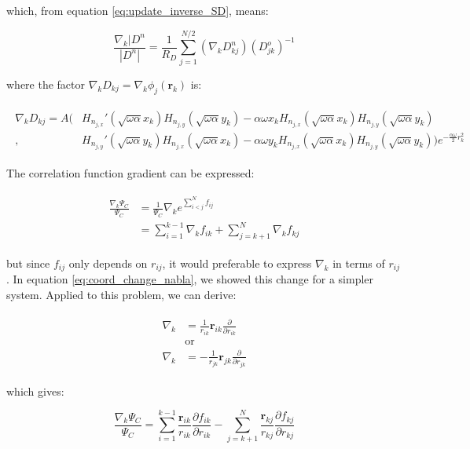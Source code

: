 \documentclass[english, a4paper]{article}
\newcommand{\bm}[1]{\mathbf{#1}}
\begin{document}
	which, from equation \ref{eq:update_inverse_SD}, means:
	
	\begin{equation}
	\frac{\nabla_k|D^n}{|D^n|} = \frac{1}{R_D}\sum_{j=1}^{N/2}(\nabla_kD_{kj}^n)(D_{jk}^o)^{-1}
	\end{equation}
	
	where the factor $\nabla_kD_{kj} = \nabla_k \phi_j(\bm{r}_k)$ is:
	
	\begin{align}
		\begin{split}
		\nabla_kD_{kj} = A\Big(&H_{n_{j,x}}'(\sqrt{\omega\alpha}x_k)H_{n_{j,y}}(\sqrt{\omega\alpha}y_k) - \alpha\omega x_kH_{n_{j,x}}(\sqrt{\omega\alpha}x_k)H_{n_{j,y}}(\sqrt{\omega\alpha}y_k)\\
		,&H_{n_{j,y}}'(\sqrt{\omega\alpha}y_k)H_{n_{j,x}}(\sqrt{\omega\alpha}x_k) - \alpha\omega y_kH_{n_{j,x}}(\sqrt{\omega\alpha}x_k)H_{n_{j,y}}(\sqrt{\omega\alpha}y_k)\Big)e^{-\frac{\alpha\omega}{2}r_k^2}
		\end{split}
	\end{align}

	The correlation function gradient can be expressed:
	
	\begin{align}
	\begin{split}
	\frac{\nabla_k \Psi_C}{\Psi_C} &= \frac{1}{\Psi_C}\nabla_k e^{\sum_{i<j}^Nf_{ij}}\\
	&= \sum_{i=1}^{k-1}\nabla_kf_{ik} + \sum_{j=k+1}^{N}\nabla_kf_{kj}
	\end{split}
	\end{align}
	
	but since $f_{ij}$ only depends on $r_{ij}$, it would preferable to express $\nabla_k$ in terms of $r_{ij}$. In equation \ref{eq:coord_change_nabla}, we showed this change for a simpler system. Applied to this problem, we can derive:
	
	\begin{align}
	\begin{split}
	\nabla_k &=  \frac{1}{r_{ik}}\bm{r}_{ik}\frac{\partial}{\partial r_{ik}}\\
	&\text{or}\\
	\nabla_k &=  -\frac{1}{r_{jk}}\bm{r}_{jk}\frac{\partial}{\partial r_{jk}}
	\end{split}
	\end{align}
	
	which gives:
	
	\begin{equation}
	\frac{\nabla_k \Psi_C}{\Psi_C} = \sum_{i=1}^{k-1}\frac{\bm{r}_{ik}}{r_{ik}}\frac{\partial f_{ik}}{\partial r_{ik}} - \sum_{j=k+1}^{N}\frac{\bm{r}_{kj}}{r_{kj}}\frac{\partial f_{kj}}{\partial r_{kj}}
	\end{equation}
	
\end{document}

